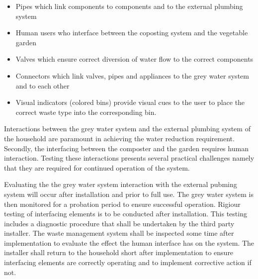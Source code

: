 \documentclass[a4paper,11pt,fleqn]{report}
\begin{document}
\begin{itemize}
\item Pipes which link components to components and to the external plumbing system
\item Human users who interface between the coposting system and the vegetable garden
\item Valves which ensure correct diversion of water flow to the correct components
\item Connectors which link valves, pipes and appliances to the grey water system and to each other
\item Visual indicators (colored bins) provide visual cues to the user to place the correct waste type into the corresponding bin.
\end{itemize}

Interactions between the grey water system and the external plumbing system of the household are paramount in achieving the water reduction requirement. Secondly, the interfacing between the composter and the garden requires human interaction. Testing these interactions presents several practical challenges namely that they are required for continued operation of the system. 

Evaluating the the grey water system interaction with the external pubming system will occur after installation and prior to full use. The grey water system is then monitored for a probation period to ensure successful operation. Rigiour testing of interfacing elements is to be conducted after installation. This testing includes a diagnostic procedure that shall be undertaken by the third party installer. The waste management system shall be inspected some time after implementation to evaluate the effect the human interface has on the system. The installer shall return to the household short after implementation to ensure interfacing elements are correctly operating and to implement corrective action if not.
\end{document}
